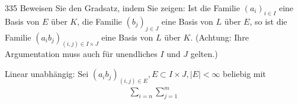 \begin{algebraUE}{335}
Beweisen Sie den Gradsatz, indem Sie zeigen: Ist die Familie $(a_i)_{i \in I}$
eine Basis von $E$ über $K$, die Familie $(b_j)_{j \in J}$ eine Basis von $L$ über $E$,
so ist die Familie $(a_ib_j)_{(i,j) \in I \times J}$ eine Basis von $L$ über $K$.
(Achtung: Ihre Argumentation muss auch für unendliches $I$ und $J$ gelten.)

\end{algebraUE}

\begin{solution}
Linear unabhängig:
Sei $(a_ib_j)_{(i,j) \in E}, E \subset I \times J, |E| < \infty$ beliebig mit
\begin{align*}
  \sum_{i = n}\sum_{j = 1}^m
\end{align*}
\end{solution}
